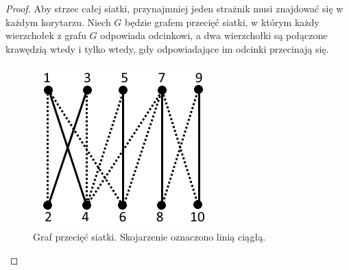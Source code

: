 \documentclass[brudnopis]{xmgr}
\theoremstyle{definition}
\begin{document}
\begin{proof}
Aby strzec całej siatki, przynajmniej jeden strażnik musi znajdować się w każdym korytarzu. Niech $G$ będzie grafem przecięć siatki, w którym każdy wierzchołek z grafu $G$ odpowiada odcinkowi, a dwa wierzchołki są połączone krawędzią wtedy i tylko wtedy, gdy odpowiadające im odcinki przecinają się.

 \begin{figure}[ht!]
   \centering
   \includegraphics{rysunki/graf_skojarzen.png}
   \caption{Graf przecięć siatki. Skojarzenie oznaczono linią ciągłą.}
   \label{fig:graf przeciec}
 \end{figure} 


\end{proof}
\end{document}
